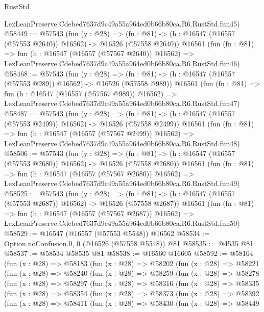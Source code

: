\begin{lexlean}{RustStd}
\begin{coremodule}
    LexLeanPreserve.Cdebed7637d9c49a55a964ed0b66b80ca.R6.RustStd.fun45)
@58449 := @57543
    (fun (y : @28) =>
    (fn : @81) -> (h : @16547 (@16557 (@57553 @2640)) @16562) -> @16526 (@57558 @2640))
    @16561
    (fun (fn : @81) =>
    fun (h : @16547 (@16557 (@57567 @2640)) @16562) =>
    LexLeanPreserve.Cdebed7637d9c49a55a964ed0b66b80ca.R6.RustStd.fun46)
@58468 := @57543
    (fun (y : @28) =>
    (fn : @81) -> (h : @16547 (@16557 (@57553 @989)) @16562) -> @16526 (@57558 @989))
    @16561
    (fun (fn : @81) =>
    fun (h : @16547 (@16557 (@57567 @989)) @16562) =>
    LexLeanPreserve.Cdebed7637d9c49a55a964ed0b66b80ca.R6.RustStd.fun47)
@58487 := @57543
    (fun (y : @28) =>
    (fn : @81) -> (h : @16547 (@16557 (@57553 @2499)) @16562) -> @16526 (@57558 @2499))
    @16561
    (fun (fn : @81) =>
    fun (h : @16547 (@16557 (@57567 @2499)) @16562) =>
    LexLeanPreserve.Cdebed7637d9c49a55a964ed0b66b80ca.R6.RustStd.fun48)
@58506 := @57543
    (fun (y : @28) =>
    (fn : @81) -> (h : @16547 (@16557 (@57553 @2680)) @16562) -> @16526 (@57558 @2680))
    @16561
    (fun (fn : @81) =>
    fun (h : @16547 (@16557 (@57567 @2680)) @16562) =>
    LexLeanPreserve.Cdebed7637d9c49a55a964ed0b66b80ca.R6.RustStd.fun49)
@58525 := @57543
    (fun (y : @28) =>
    (fn : @81) -> (h : @16547 (@16557 (@57553 @2687)) @16562) -> @16526 (@57558 @2687))
    @16561
    (fun (fn : @81) =>
    fun (h : @16547 (@16557 (@57567 @2687)) @16562) =>
    LexLeanPreserve.Cdebed7637d9c49a55a964ed0b66b80ca.R6.RustStd.fun50)
@58529 := @16547 (@16557 (@57553 @5548)) @16562
@58534 := Option.noConfusion.{0, 0} (@16526 (@57558 @5548)) @81
@58535 := @4535 @81
@58537 := @58534 @58535 @81
@58538 := @16560 @16605
@58592 := @58164
    (fun (x : @28) =>
    @58183
      (fun (x : @28) =>
      @58202
        (fun (x : @28) =>
        @58221
          (fun (x : @28) =>
          @58240
            (fun (x : @28) =>
            @58259
              (fun (x : @28) =>
              @58278
                (fun (x : @28) =>
                @58297
                  (fun (x : @28) =>
                  @58316
                    (fun (x : @28) =>
                    @58335
                      (fun (x : @28) =>
                      @58354
                        (fun (x : @28) =>
                        @58373
                          (fun (x : @28) =>
                          @58392
                            (fun (x : @28) =>
                            @58411
                              (fun (x : @28) =>
                              @58430
                                (fun (x : @28) =>
                                @58449

\end{coremodule}
\end{lexlean}
